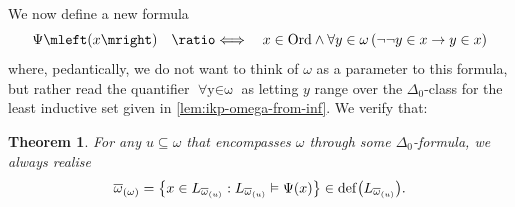 \documentclass[12pt,openany]{book}
\theoremstyle{plain}
\newtheorem{theorem}{Theorem}[section]
\theoremstyle{definition}
\newcommand\opA[1]{\mathop{\forall #1}}
\newcommand\defeqv{\quad \ratio\Longleftrightarrow \quad}
\DeclareMathOperator\dd{def}
\newcommand\Ord{\mathrm{Ord}}
\begin{document}
We now define a new formula
\[\Psi\mleft(x\mright) \defeqv x \in \Ord \land \opA{y \in \omega} \left(\neg \neg y \in x \rightarrow y \in x\right)\]
where, pedantically, we do not want to think of $\omega$ as a parameter to this formula, but rather read the quantifier $\opA{y \in \omega}$ as letting $y$ range over the $\Delta_0$-class for the least inductive set given in \autoref{lem:ikp-omega-from-inf}. We verify that:
\begin{theorem}
  \label{thm:exo-omega-l-con-max-omega}
  For any $u \subseteq \omega$ that encompasses $\omega$ through some $\Delta_0$-formula, we always realise
  \[\overline{\omega}_{(\omega)} = \left\{x \in L_{\overline{\omega}_{(u)}} : L_{\overline{\omega}_{(u)}} \vDash \Psi\mleft(x\mright)\right\} \in \dd\mleft(L_{\overline{\omega}_{(u)}}\mright).\]
\end{theorem}
\end{document}
